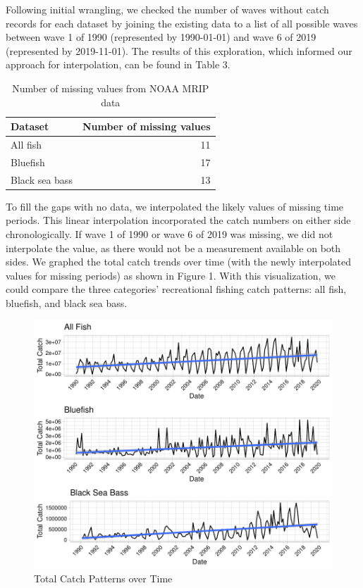 \documentclass[
  12pt,
]{article}
\begin{document}
Following initial wrangling, we checked the number of waves without
catch records for each dataset by joining the existing data to a list of
all possible waves between wave 1 of 1990 (represented by 1990-01-01)
and wave 6 of 2019 (represented by 2019-11-01). The results of this
exploration, which informed our approach for interpolation, can be found
in Table 3.

\begin{table}[H]

\caption{\label{tab:table3}Number of missing values from NOAA MRIP data}
\centering
\begin{tabular}[t]{l|r}
\hline
Dataset & Number of missing values\\
\hline
All fish & 11\\
\hline
Bluefish & 17\\
\hline
Black sea bass & 13\\
\hline
\end{tabular}
\end{table}

To fill the gaps with no data, we interpolated the likely values of
missing time periods. This linear interpolation incorporated the catch
numbers on either side chronologically. If wave 1 of 1990 or wave 6 of
2019 was missing, we did not interpolate the value, as there would not
be a measurement available on both sides. We graphed the total catch
trends over time (with the newly interpolated values for missing
periods) as shown in Figure 1. With this visualization, we could compare
the three categories' recreational fishing catch patterns: all fish,
bluefish, and black sea bass.

\begin{figure}[H]

\hfill{}\includegraphics{Report_FishTrends_files/figure-latex/ggplot-1} 

\caption{Total Catch Patterns over Time}\label{fig:ggplot}
\end{figure}
\end{document}
